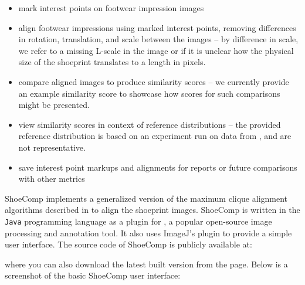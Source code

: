 \documentclass{csafedoc}
\begin{document}
\begin{itemize}
	\item mark interest points on footwear impression images
	\item align footwear impressions using marked interest points, removing differences in
	      rotation, translation, and scale between the images -- by difference in scale, we
	      refer to a missing L-scale in the image or if it is unclear how the physical size of the
	      shoeprint translates to a length in pixels.
	\item compare aligned images to produce similarity scores -- we currently provide an
	      example similarity score to showcase how scores for such comparisons might be presented.
	\item view similarity scores in context of reference distributions -- the provided reference
	      distribution is based on an experiment run on data from \cite{soyoung}, and are
	      not representative.
	\item save interest point markups and alignments for reports or future comparisons with other metrics
\end{itemize}

ShoeComp implements a generalized version of the maximum clique alignment algorithms
described in \cite{soyoung, gvs1} to align the shoeprint images. ShoeComp is written in
the \texttt{Java} programming language as a plugin for
, a popular open-source image processing and
annotation tool. It also uses ImageJ's  plugin to provide a simple user interface. The
source code of ShoeComp is publicly available at:

\begin{center}
\end{center}

where you can also download the latest built version from the
 page. Below is a
screenshot of the basic ShoeComp user interface:
\end{document}
